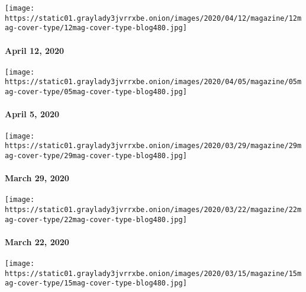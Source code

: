 \href{https://www.nytimes3xbfgragh.onion/issue/magazine/2020/04/10/the-41220-issue}{}

\texttt{[image: https://static01.graylady3jvrrxbe.onion/images/2020/04/12/magazine/12mag-cover-type/12mag-cover-type-blog480.jpg]}

\hypertarget{april-12-2020}{%
\paragraph{April 12, 2020}\label{april-12-2020}}

\href{https://www.nytimes3xbfgragh.onion/issue/magazine/2020/04/03/the-4520-issue}{}

\texttt{[image: https://static01.graylady3jvrrxbe.onion/images/2020/04/05/magazine/05mag-cover-type/05mag-cover-type-blog480.jpg]}

\hypertarget{april-5-2020}{%
\paragraph{April 5, 2020}\label{april-5-2020}}

\href{https://www.nytimes3xbfgragh.onion/issue/magazine/2020/03/27/the-32920-issue}{}

\texttt{[image: https://static01.graylady3jvrrxbe.onion/images/2020/03/29/magazine/29mag-cover-type/29mag-cover-type-blog480.jpg]}

\hypertarget{march-29-2020}{%
\paragraph{March 29, 2020}\label{march-29-2020}}

\href{https://www.nytimes3xbfgragh.onion/issue/magazine/2020/03/19/the-32220-issue}{}

\texttt{[image: https://static01.graylady3jvrrxbe.onion/images/2020/03/22/magazine/22mag-cover-type/22mag-cover-type-blog480.jpg]}

\hypertarget{march-22-2020}{%
\paragraph{March 22, 2020}\label{march-22-2020}}

\href{https://www.nytimes3xbfgragh.onion/interactive/2020/03/11/magazine/best-songs.html\#cover}{}

\texttt{[image: https://static01.graylady3jvrrxbe.onion/images/2020/03/15/magazine/15mag-cover-type/15mag-cover-type-blog480.jpg]}

